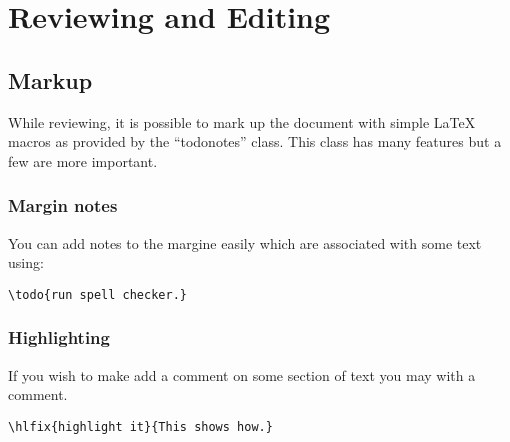 \chapter{Reviewing and Editing}


\section{Markup}

While reviewing, it is possible to mark up the document with simple
\LaTeX{} macros as provided by the ``todonotes'' class.
This class has many features but a few are more important.


\subsection{Margin notes}

You can add notes to the margine easily which
are associated with some text using:

\begin{verbatim}
\todo{run spell checker.}
\end{verbatim}

\subsection{Highlighting}

If you wish to make add a comment on some section of text you may
with a comment.


\begin{verbatim}
\hlfix{highlight it}{This shows how.}
\end{verbatim}

